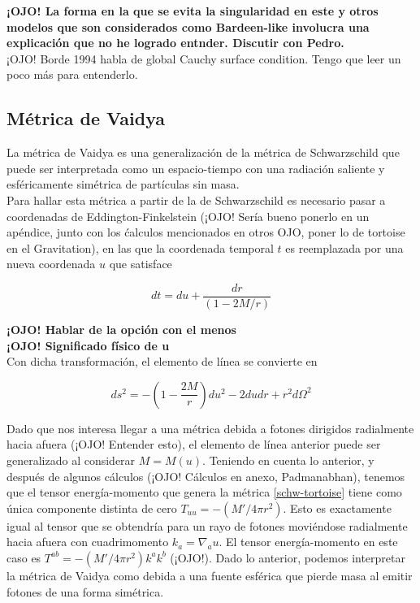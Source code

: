 \documentclass{article}
\numberwithin{equation}{section}
\begin{document}
\textbf{¡OJO! La forma en la que se evita la singularidad en este y otros modelos que son considerados como Bardeen-like involucra una explicación que no he logrado entnder. Discutir con Pedro.}\\

¡OJO! Borde 1994 habla de global Cauchy surface condition. Tengo que leer un poco más para entenderlo.


\subsection{Métrica de Vaidya}

La métrica de Vaidya \cite{padmanabhan} es una generalización de la métrica de Schwarzschild que puede ser interpretada como un espacio-tiempo con una radiación saliente y esféricamente simétrica de partículas sin masa.\\

Para hallar esta métrica a partir de la de Schwarzschild es necesario pasar a coordenadas de Eddington-Finkelstein (¡OJO! Sería bueno ponerlo en un apéndice, junto con los ćalculos mencionados en otros OJO, poner lo de tortoise en el Gravitation), en las que la coordenada temporal $t$ es reemplazada por una nueva coordenada $u$ que satisface

\begin{equation}
dt = du + \frac{dr}{(1 - 2M/r)}
\end{equation}

\textbf{¡OJO! Hablar de la opción con el menos}\\

\textbf{¡OJO! Significado físico de u}\\

Con dicha transformación, el elemento de línea se convierte en 

\begin{equation}
\label{schw-tortoise}
ds^2 = - \left(1- \frac{2M}{r}\right)du^2 - 2dudr + r^2d\Omega^2
\end{equation}

Dado que nos interesa llegar a una métrica debida a fotones dirigidos radialmente hacia afuera (¡OJO! Entender esto), el elemento de línea anterior puede ser generalizado al considerar $M = M(u)$. Teniendo en cuenta lo anterior, y después de algunos cálculos (¡OJO! Cálculos en anexo, Padmanabhan), tenemos que el tensor energía-momento que genera la métrica \eqref{schw-tortoise} tiene como única componente distinta de cero $T_{uu} = -(M'/4 \pi r^2)$. Esto es exactamente igual al tensor que se obtendría para un rayo de fotones moviéndose radialmente hacia afuera con cuadrimomento $k_{a} = \nabla_{a}u$. El tensor energía-momento en este caso es $T^{ab} = -(M'/4 \pi r^2)k^{a}k^{b}$ (¡OJO!). Dado lo anterior, podemos interpretar la métrica de Vaidya como debida a una fuente esférica que pierde masa al emitir fotones de una forma simétrica.\\
\end{document}
